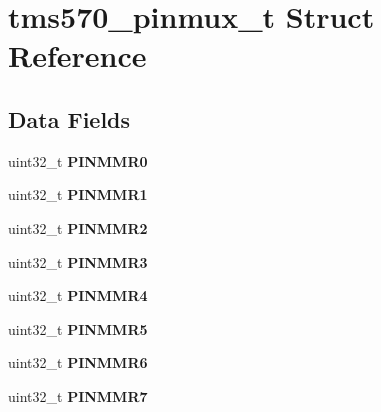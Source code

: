 \hypertarget{structtms570__pinmux__t}{}\section{tms570\+\_\+pinmux\+\_\+t Struct Reference}
\label{structtms570__pinmux__t}
\subsection*{Data Fields}
\begin{DoxyCompactItemize}
\item 
\mbox{\label{structtms570__pinmux__t_a2ae6be83188dedfe178f76dd833b8a51}} 
uint32\+\_\+t {\bfseries P\+I\+N\+M\+M\+R0}
\item 
\mbox{\label{structtms570__pinmux__t_a429a3f9d35e6958ae2501ac9f8c8ee0e}} 
uint32\+\_\+t {\bfseries P\+I\+N\+M\+M\+R1}
\item 
\mbox{\label{structtms570__pinmux__t_a92c69f7d3d77223658fbc5f3462d0b9e}} 
uint32\+\_\+t {\bfseries P\+I\+N\+M\+M\+R2}
\item 
\mbox{\label{structtms570__pinmux__t_a1bbd8c75f5894b64d5f90435fa0726fe}} 
uint32\+\_\+t {\bfseries P\+I\+N\+M\+M\+R3}
\item 
\mbox{\label{structtms570__pinmux__t_ac9bc45cb11ffb5f9b01b34d222717007}} 
uint32\+\_\+t {\bfseries P\+I\+N\+M\+M\+R4}
\item 
\mbox{\label{structtms570__pinmux__t_ab6516b9347afa6e214c3d14acc86cbbf}} 
uint32\+\_\+t {\bfseries P\+I\+N\+M\+M\+R5}
\item 
\mbox{\label{structtms570__pinmux__t_a61a9781e2d3c61566408d0d14b4afb92}} 
uint32\+\_\+t {\bfseries P\+I\+N\+M\+M\+R6}
\item 
\mbox{\label{structtms570__pinmux__t_af91f42104205ee896a81b338307dfc3e}} 
uint32\+\_\+t {\bfseries P\+I\+N\+M\+M\+R7}
\item 
\mbox{\label{structtms570__pinmux__t_a0912a087c6ff0cb7458772be1c9c59d5}} 

\end{DoxyCompactItemize}
